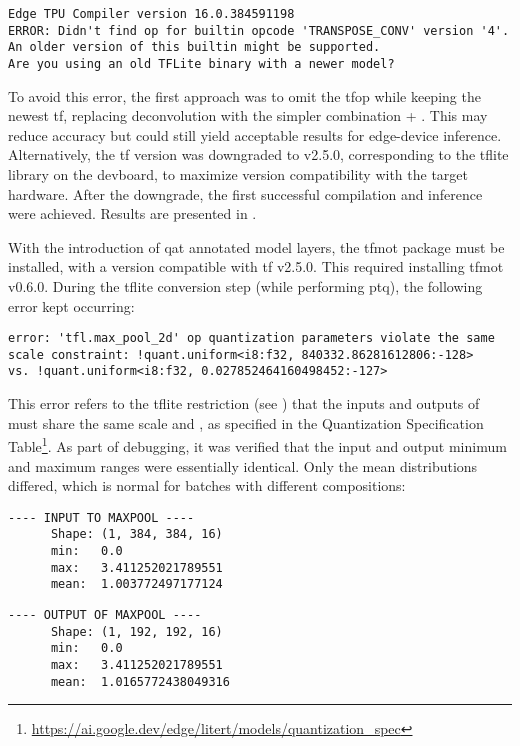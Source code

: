 {\begin{lstlisting}
Edge TPU Compiler version 16.0.384591198
ERROR: Didn't find op for builtin opcode 'TRANSPOSE_CONV' version '4'.
An older version of this builtin might be supported.
Are you using an old TFLite binary with a newer model?
\end{lstlisting}

To avoid this error, the first approach was to omit the  \gls{tfop} while keeping the newest \gls{tf},
replacing deconvolution with the simpler combination  + .
This may reduce accuracy but could still yield acceptable results for edge-device inference. Alternatively,
the \gls{tf} version was downgraded to v2.5.0, corresponding to the \gls{tflite} library on the \gls{devboard},
to maximize version compatibility with the target hardware. After the downgrade, the first successful compilation and inference were achieved.
Results are presented in .

With the introduction of \gls{qat} annotated model layers, the \gls{tfmot} package must be installed, with a version compatible with \gls{tf} v2.5.0.
This required installing \gls{tfmot} v0.6.0.
During the \gls{tflite} conversion step (while performing \gls{ptq}), the following error kept occurring:

\begin{lstlisting}
error: 'tfl.max_pool_2d' op quantization parameters violate the same
scale constraint: !quant.uniform<i8:f32, 840332.86281612806:-128>
vs. !quant.uniform<i8:f32, 0.027852464160498452:-127>
\end{lstlisting}

This error refers to the \gls{tflite} restriction (see ) that the inputs and outputs of  must share the same scale and ,
as specified in the Quantization Specification Table\footnote{\url{https://ai.google.dev/edge/litert/models/quantization_spec}}.
As part of debugging, it was verified that the input and output minimum and maximum ranges were essentially identical. Only the mean distributions differed,
which is normal for batches with different compositions:

\noindent
\begin{minipage}[t]{0.48\textwidth}
\begin{lstlisting}[basicstyle=\ttfamily\small\centering, columns=fullflexible, keepspaces=true, frame=single]
      ---- INPUT TO MAXPOOL ----
      Shape: (1, 384, 384, 16)
      min:   0.0
      max:   3.411252021789551
      mean:  1.003772497177124
\end{lstlisting}
\end{minipage}%
\hfill
\begin{minipage}[t]{0.48\textwidth}
\begin{lstlisting}[basicstyle=\ttfamily\small\centering, columns=fullflexible, keepspaces=true, frame=single]
      ---- OUTPUT OF MAXPOOL ----
      Shape: (1, 192, 192, 16)
      min:   0.0
      max:   3.411252021789551
      mean:  1.0165772438049316
\end{lstlisting}
\end{minipage}

}
